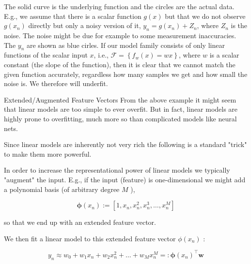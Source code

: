 \documentclass[10pt]{article}
\begin{document}
The solid curve is the underlying function and the circles are the actual data. E.g., we assume that there is a scalar function $g(x)$ but that we do not observe $g\left(x_{n}\right)$ directly but only a noisy version of it, $y_{n}=g\left(x_{n}\right)+Z_{n}$, where $Z_{n}$ is
the noise. The noise might be due for example to some measurement inaccuracies. The $y_{n}$ are shown as blue cirles. If our model family consists of only linear functions of the scalar input $x$, i.e., $\mathcal{F}=\left\{f_{w}(x)=w x\right\}$, where $w$ is a scalar constant (the slope of the function), then it is clear that we cannot match the given function accurately, regardless how many samples we get and how small the noise is. We therefore will underfit.

Extended/Augmented Feature Vectors From the above example it might seem that linear models are too simple to ever overfit. But in fact, linear models are highly prone to overfitting, much more so than complicated models like neural nets.

Since linear models are inherently not very rich the following is a standard "trick" to make them more powerful.

In order to increase the representational power of linear models we typically "augment" the input. E.g., if the input (feature) is one-dimensional we might add a polynomial basis (of arbitrary degree $M$ ),

$$
\boldsymbol{\phi}\left(x_{n}\right):=\left[1, x_{n}, x_{n}^{2}, x_{n}^{3}, \ldots, x_{n}^{M}\right]
$$

so that we end up with an extended feature vector.

We then fit a linear model to this extended feature vector $\phi\left(x_{n}\right)$ :

$$
y_{n} \approx w_{0}+w_{1} x_{n}+w_{2} x_{n}^{2}+\ldots+w_{M} x_{n}^{M}=: \boldsymbol{\phi}\left(x_{n}\right)^{\top} \mathbf{w}
$$
\end{document}
